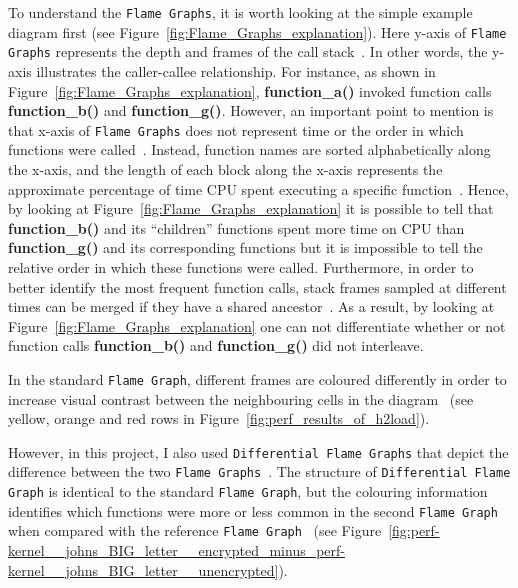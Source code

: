 \documentclass[12pt,a4paper,twoside,openright]{report}
\begin{document}
To understand the \texttt{Flame Graphs}, it is worth looking at the simple example diagram first (see Figure~\ref{fig:Flame_Graphs_explanation}).
Here y-axis of \texttt{Flame Graphs} represents the depth and frames of the call stack~\cite{CPU_Flame_graphs}.
In other words, the y-axis illustrates the caller-callee relationship.
For instance, as shown in Figure~\ref{fig:Flame_Graphs_explanation}, \textbf{function\_a()} invoked function calls \textbf{function\_b()} and \textbf{function\_g()}. 
However, an important point to mention is that x-axis of \texttt{Flame Graphs} does not represent time or the order in which functions were called~\cite{CPU_Flame_graphs}.
Instead, function names are sorted alphabetically along the x-axis, and the length of each block along the x-axis represents the approximate percentage of time CPU spent executing a specific function~\cite{CPU_Flame_graphs}.
Hence, by looking at Figure~\ref{fig:Flame_Graphs_explanation} it is possible to tell that \textbf{function\_b()} and its \enquote{children} functions spent more time on CPU than \textbf{function\_g()} and its corresponding functions but it is impossible to tell the relative order in which these functions were called.
Furthermore, in order to better identify the most frequent function calls, stack frames sampled at different times can be merged if they have a shared ancestor~\cite{CPU_Flame_graphs}.
As a result, by looking at Figure~\ref{fig:Flame_Graphs_explanation} one can not differentiate whether or not function calls \textbf{function\_b()} and \textbf{function\_g()} did not interleave.

In the standard \texttt{Flame Graph}, different frames are coloured differently in order to increase visual contrast between the neighbouring cells in the diagram~\cite{CPU_Flame_graphs} (see yellow, orange and red rows in Figure~\ref{fig:perf_results_of_h2load}).


However, in this project, I also used \texttt{Differential Flame Graphs} that depict the difference between the two \texttt{Flame Graphs}~\cite{Differential_Flame_Graphs}.
The structure of \texttt{Differential Flame Graph} is identical to the standard \texttt{Flame Graph}, but the colouring information identifies which functions were more or less common in the second \texttt{Flame Graph} when compared with the reference \texttt{Flame Graph}~\cite{Differential_Flame_Graphs} (see Figure~\ref{fig:perf-kernel__johns_BIG_letter__encrypted_minus_perf-kernel__johns_BIG_letter__unencrypted}).
\end{document}
